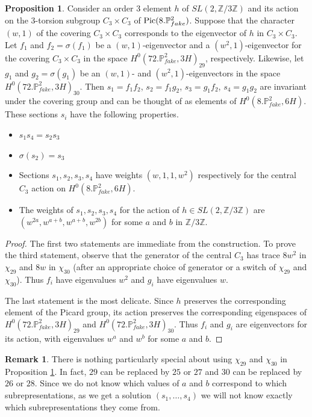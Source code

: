 \documentclass[11pt,reqno]{amsart}
\def\Z {{\mathbb Z}}
\def\P {{\mathbb P}}
\def\FPP {{\P^2_{fake}}}
\theoremstyle{definition}
\newtheorem{proposition}[theorem]{Proposition}
\newtheorem{remark}[theorem]{Remark}
\numberwithin{equation}{section}
\begin{document}
\begin{proposition}\label{key}
Consider an order $3$ element $h$ of $SL(2,\Z/3\Z)$ and its action on the $3$-torsion  subgroup $C_3\times C_3$ of ${\rm Pic}(8.\FPP)$. Suppose that the 
character $(w,1)$ of the covering $C_3\times C_3$ corresponds to the eigenvector of $h$ in $C_3\times C_3$.
Let $f_1$ and $f_2 = \sigma(f_1)$ be a $(w,1)$-eigenvector and a  $(w^2,1)$-eigenvector for the covering $C_3\times C_3$ in the space $H^0(72.\FPP,3H)_{29}$, respectively.
Likewise, let $g_1$ and $g_2=\sigma(g_1)$ be an $(w,1)$- and $(w^2,1)$-eigenvectors  in the space $H^0(72.\FPP,3H)_{30}$. Then  $s_1 = f_1 f_2$, $s_2 = f_1 g_2$, $s_3 = g_1 f_2$, $s_4 = g_1 g_2 $
are invariant under the covering group and can be thought of as elements of $H^0(8.\FPP,6H)$. These sections $s_i$ have the following properties.
\begin{itemize}
\item
$
s_1s_4 = s_2 s_3
$ 
\item 
$\sigma(s_2) = s_3$
\item
Sections $s_1,s_2, s_3,s_4$ have weights $(w,1,1,w^2)$ respectively for the central $C_3$ action on $H^0(8.\FPP,6H)$. 
\item
The weights of $s_1,s_2,s_3,s_4$ for the action of $h\in SL(2,\Z/3\Z)$ are $(w^{2a},w^{a+b},w^{a+b},w^{2b})$ for some $a$ and $b$ in $\Z/3\Z$.
\end{itemize}
\end{proposition}

\begin{proof}
The first two statements are immediate from the construction. To prove the third statement, observe that the generator of the central $C_3$  has trace $8w^2$
in $\chi_{29}$ and $8w$ in $\chi_{30}$ (after an appropriate choice of generator or a switch of $\chi_{29}$ and $\chi_{30}$). Thus $f_i$ have eigenvalues $w^2$ and $g_i$ have eigenvalues $w$. 

\medskip
The last statement is the most delicate. Since $h$ preserves the corresponding element of the Picard group, its action preserves the corresponding eigenspaces of $H^0(72.\FPP,3H)_{29}$ and $H^0(72.\FPP,3H)_{30}$. Thus $f_i$ and $g_i$ are eigenvectors for its action, with eigenvalues $w^a$ and $w^b$ for some $a$ and $b$.
\end{proof}

\begin{remark}\label{notspecial}
There is nothing particularly special about using $\chi_{29}$ and $\chi_{30}$ in Proposition \ref{key}. In fact, $29$ can be replaced by $25$ or $27$ and $30$ can be replaced by $26$ or $28$. Since we do not know which values of $a$ and $b$ correspond to which subrepresentations, as we get a solution $(s_1,\ldots,s_4)$ we will not know exactly which subrepresentations they come from. 
\end{remark}
\end{document}
